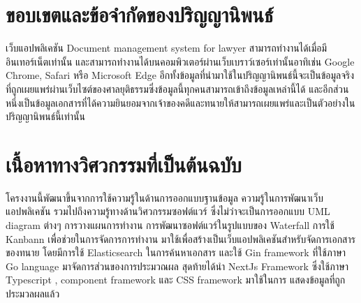 \documentclass[12pt,oneside,openright,a4paper]{cpe-thai-project}
\begin{document}
\section{ขอบเขตและข้อจำกัดของปริญญานิพนธ์}
\hspace*{1cm}เว็บแอปพลิเคชัน Document management system for lawyer สามารถทำงานได้เมื่อมีอินเทอร์เน็ตเท่านั้น และสามารถทำงานได้บนคอมพิวเตอร์ผ่านเว็บเบราว์เซอร์เท่านั้นอาทิเช่น Google Chrome, Safari หรือ Microsoft Edge อีกทั้งข้อมูลที่นำมาใช้ในปริญญานิพนธ์นี้จะเป็นข้อมูลจริงที่ถูกเผยแพร่ผ่านเว็บไซต์ของศาลยุติธรรมซึ่งข้อมูลนี้ทุกคนสามารถเข้าถึงข้อมูลเหล่านี้ได้ และอีกส่วนหนึ่งเป็นข้อมูลเอกสารที่ได้ความยินยอมจากเจ้าของคดีและทนายให้สามารถเผยแพร่และเป็นตัวอย่างในปริญญานิพนธ์นี้เท่านั้น

\section{เนื้อหาทางวิศวกรรมที่เป็นต้นฉบับ}
\hspace*{1cm}โครงงานนี้พัฒนาขึ้นจากการใช้ความรู้ในด้านการออกแบบฐานข้อมูล ความรู้ในการพัฒนาเว็บแอปพลิเคชัน รวมไปถึงความรู้ทางด้านวิศวกรรมซอฟต์แวร์ ซึ่งไม่ว่าจะเป็นการออกแบบ UML diagram ต่างๆ การวางแผนการทำงาน การพัฒนาซอฟต์แวร์ในรูปแบบของ Waterfall การใช้ Kanbann เพื่อช่วยในการจัดการการทำงาน มาใช้เพื่อสร้างเป็นเว็บแอปพลิเคชันสำหรับจัดการเอกสารของทนาย โดยมีการใช้ Elasticsearch ในการค้นหาเอกสาร และใช้ Gin framework ที่ใช้ภาษา Go language มาจัดการส่วนของการประมวณผล สุดท้ายได้นำ NextJs Framework ซึ่งใช้ภาษา Typescript , component framework และ CSS framework มาใช้ในการ แสดงข้อมูลที่ถูกประมวลผลแล้ว 

\newpage
\end{document}
